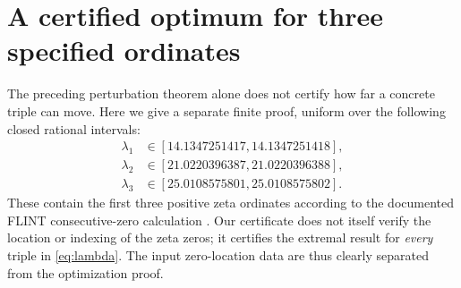 \documentclass[11pt]{article}
\theoremstyle{remark}\newtheorem{remark}[theorem]{Remark}
\begin{document}
\section{A certified optimum for three specified ordinates}\label{sec:cert}
The preceding perturbation theorem alone does not certify how far a concrete triple can move. Here we give a separate finite proof, uniform over the following closed rational intervals:
\begin{equation}\label{eq:lambda}
\begin{split}
 \lambda_1&\in[14.1347251417,14.1347251418],\\
 \lambda_2&\in[21.0220396387,21.0220396388],\\
 \lambda_3&\in[25.0108575801,25.0108575802].
\end{split}
\end{equation}
These contain the first three positive zeta ordinates according to the documented FLINT consecutive-zero calculation \cite{flint}. Our certificate does not itself verify the location or indexing of the zeta zeros; it certifies the extremal result for \emph{every} triple in \eqref{eq:lambda}. The input zero-location data are thus clearly separated from the optimization proof.
\end{document}
